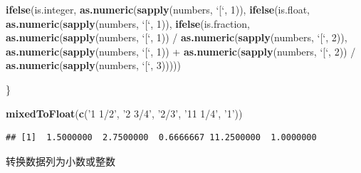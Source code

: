 \documentclass[]{article}
\newenvironment{Shaded}{\begin{snugshade}}{\end{snugshade}}
\newcommand{\KeywordTok}[1]{\textcolor[rgb]{0.13,0.29,0.53}{\textbf{{#1}}}}
\newcommand{\DataTypeTok}[1]{\textcolor[rgb]{0.13,0.29,0.53}{{#1}}}
\newcommand{\DecValTok}[1]{\textcolor[rgb]{0.00,0.00,0.81}{{#1}}}
\newcommand{\StringTok}[1]{\textcolor[rgb]{0.31,0.60,0.02}{{#1}}}
\newcommand{\NormalTok}[1]{{#1}}
\numberwithin{figure}{section}
\numberwithin{table}{section}
\theoremstyle{definition}
\theoremstyle{definition}
\theoremstyle{definition}
\theoremstyle{remark}
\begin{document}
\begin{Shaded}
\begin{Highlighting}[]
  \KeywordTok{ifelse}\NormalTok{(is.integer,  }\KeywordTok{as.numeric}\NormalTok{(}\KeywordTok{sapply}\NormalTok{(numbers, }\StringTok{`}\DataTypeTok{[}\StringTok{`}\NormalTok{, }\DecValTok{1}\NormalTok{)),}
  \KeywordTok{ifelse}\NormalTok{(is.float,    }\KeywordTok{as.numeric}\NormalTok{(}\KeywordTok{sapply}\NormalTok{(numbers, }\StringTok{`}\DataTypeTok{[}\StringTok{`}\NormalTok{, }\DecValTok{1}\NormalTok{)),}
  \KeywordTok{ifelse}\NormalTok{(is.fraction, }\KeywordTok{as.numeric}\NormalTok{(}\KeywordTok{sapply}\NormalTok{(numbers, }\StringTok{`}\DataTypeTok{[}\StringTok{`}\NormalTok{, }\DecValTok{1}\NormalTok{)) /}
\StringTok{                      }\KeywordTok{as.numeric}\NormalTok{(}\KeywordTok{sapply}\NormalTok{(numbers, }\StringTok{`}\DataTypeTok{[}\StringTok{`}\NormalTok{, }\DecValTok{2}\NormalTok{)),}
                      \KeywordTok{as.numeric}\NormalTok{(}\KeywordTok{sapply}\NormalTok{(numbers, }\StringTok{`}\DataTypeTok{[}\StringTok{`}\NormalTok{, }\DecValTok{1}\NormalTok{)) +}
\StringTok{                      }\KeywordTok{as.numeric}\NormalTok{(}\KeywordTok{sapply}\NormalTok{(numbers, }\StringTok{`}\DataTypeTok{[}\StringTok{`}\NormalTok{, }\DecValTok{2}\NormalTok{)) /}
\StringTok{                      }\KeywordTok{as.numeric}\NormalTok{(}\KeywordTok{sapply}\NormalTok{(numbers, }\StringTok{`}\DataTypeTok{[}\StringTok{`}\NormalTok{, }\DecValTok{3}\NormalTok{)))))}
  
\NormalTok{\}}

\KeywordTok{mixedToFloat}\NormalTok{(}\KeywordTok{c}\NormalTok{(}\StringTok{'1 1/2'}\NormalTok{, }\StringTok{'2 3/4'}\NormalTok{, }\StringTok{'2/3'}\NormalTok{, }\StringTok{'11 1/4'}\NormalTok{, }\StringTok{'1'}\NormalTok{))}
\end{Highlighting}
\end{Shaded}

\begin{verbatim}
## [1]  1.5000000  2.7500000  0.6666667 11.2500000  1.0000000
\end{verbatim}

转换数据列为小数或整数

\begin{Shaded}
\end{Shaded}
\end{document}
